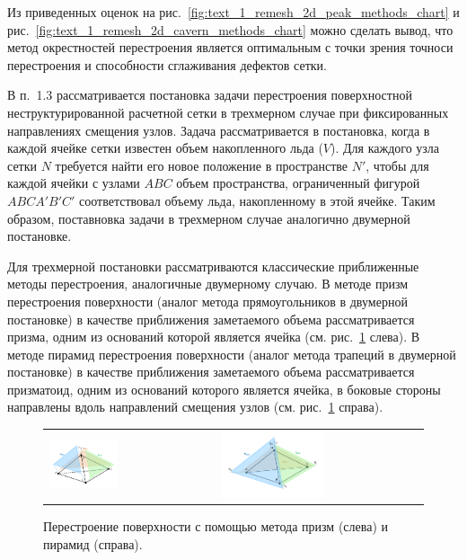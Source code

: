 \documentclass[a4paper,14pt]{extarticle}                     %
\theoremstyle{plain}                                         %
\begin{document}
Из приведенных оценок на рис.~\ref{fig:text_1_remesh_2d_peak_methods_chart} и рис.~\ref{fig:text_1_remesh_2d_cavern_methods_chart} можно сделать вывод, что метод окрестностей перестроения является оптимальным с точки зрения точноси перестроения и способности сглаживания дефектов сетки.


В п.~1.3 рассматривается постановка задачи перестроения поверхностной неструктурированной расчетной сетки в трехмерном случае при фиксированных направлениях смещения узлов.
Задача рассматривается в постановка, когда в каждой ячейке сетки известен объем накопленного льда ($V$).
Для каждого узла сетки $N$ требуется найти его новое положение в пространстве $N'$, чтобы для каждой ячейки с узлами $ABC$ объем пространства, ограниченный фигурой $ABCA'B'C'$ соответствовал объему льда, накопленному в этой ячейке.
Таким образом, поставновка задачи в трехмерном случае аналогично двумерной постановке.

Для трехмерной постановки рассматриваются классические приближенные методы перестроения, аналогичные двумерному случаю.
В методе призм перестроения поверхности (аналог метода прямоугольников в двумерной постановке) в качестве приближения заметаемого объема рассматривается призма, одним из оснований которой является ячейка (см. рис.~\ref{fig:text_1_remesh3_rect} слева).
В методе пирамид перестроения поверхности (аналог метода трапеций в двумерной постановке) в качестве приближения заметаемого объема рассматривается призматоид, одним из оснований которого является ячейка, в боковые стороны направлены вдоль направлений смещения узлов (см. рис.~\ref{fig:text_1_remesh3_rect} справа).

\begin{figure}[h]
\centering
\begin{tabular}{ll}
\includegraphics[width=0.43\textwidth]{pics/text_1_remesh_3d/pic_classical_methods_prisms.pdf}
&
\includegraphics[width=0.52\textwidth]{pics/text_1_remesh_3d/pic_classical_methods_pyramids.pdf}
\end{tabular}
\singlespacing
{}\caption{Перестроение поверхности с помощью метода призм (слева) и пирамид (справа).}
\label{fig:text_1_remesh3_rect}
\end{figure}
\end{document}
